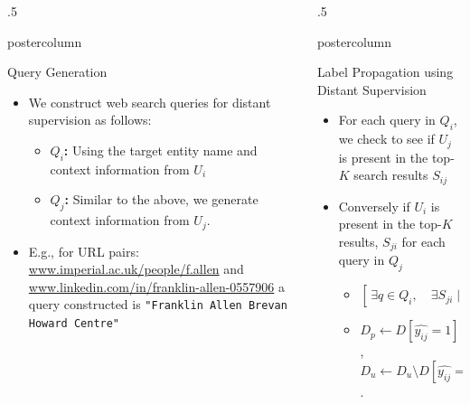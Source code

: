 \documentclass{beamer}
\newlength{\columnheight}
\begin{document}
\begin{frame}
\begin{columns}
\begin{column}{.5\textwidth}
\begin{beamercolorbox}[center]{postercolumn}
\begin{minipage}{.98\textwidth}
{         \begin{block}{Query Generation}
\begin{itemize}
\item We construct web search queries for distant supervision as follows:
\begin{itemize}
\item \textbf{$Q_i$:} Using the target entity name and context information from $U_{i}$
\item \textbf{$Q_j$:} Similar to the above, we generate context information from  $U_{j}$.
\end{itemize}
\item E.g., for URL pairs: {\color{blue} \small \url{www.imperial.ac.uk/people/f.allen}} and {\color{blue} \small \url{www.linkedin.com/in/franklin-allen-0557906}}
a query constructed is {\color{cyan} \tt \small {"Franklin Allen Brevan Howard Centre"}}
\end{itemize}
\vspace{0.5em}
\end{block} \vfill
		}\end{minipage}\end{beamercolorbox}
	\end{column}
	\begin{column}{.5\textwidth}
		\begin{beamercolorbox}[center]{postercolumn}
			\begin{minipage}{.98\textwidth} %
				\parbox[t][\columnheight]{\textwidth}{ %



\begin{block}{Label Propagation using Distant Supervision}
\begin{itemize}
\item For each query in $Q_i$, we check to see if $U_{j}$ is present in the top-$K$ search results $S_{ij}$
	\vspace{0.5em}
\item Conversely if $U_i$ is present in the top-$K$ results, $S_{ji}$ for each query in $Q_j$
	\vspace{0.7em}
\begin{itemize}
\item $[ \, \exists  q \in Q_i,  \quad \exists S_{ji} \mid U_j \in S_{ji} \lor \exists q \in Q_j,  \quad \exists S_{ij} \mid U_i \in S_{ij} ] \, \implies \hat{y_{ij}}=1$
	\vspace{0.7em}
\item $D_{p} \gets D[\hat{y_{ij}}=1]$, $D_{u} \gets D_{u} \setminus D[\hat{y_{ij}}=1]$.
\end{itemize}
\end{itemize}
\vspace{0.5em}


\end{block}}
\end{minipage}
\end{beamercolorbox}
\end{column}
\end{columns}
\end{frame}
\end{document}
